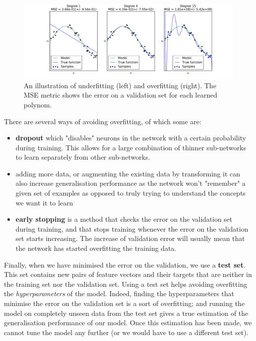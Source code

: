 \begin{figure}
	\centering
	\includegraphics[width=0.8\linewidth]{fig/overfitting.pdf}
	\caption{An illustration of underfitting (left) and overfitting (right).
	The MSE metric shows the error on a validation set for each learned
	polynom.}
	\label{fig:overfitting}
\end{figure}

There are several ways of avoiding overfitting, of which some are:
\begin{itemize}
	\item \textbf{dropout} \cite{dropout} which "disables" neurons in the 
		network with a certain probability during training. This allows
		for a large combination of thinner sub-networks to learn
		separately from other sub-networks.
	\item adding more data, or augmenting the existing data by transforming
		it can also increase generalisation performance as the network
		won't "remember" a given set of examples as opposed to truly
		trying to understand the concepts we want it to learn
	\item \textbf{early stopping} is a method that checks the error
		on the validation set during training, and that stops training
		whenever the error on the validation set starts increasing.
		The increase of validation error will usually mean that the
		network has started overfitting the training data.
\end{itemize}

Finally, when we have minimised the error on the validation, we use 
a \textbf{test set}. This set contains new pairs of feature vectors and their
targets that are neither in the training set nor the validation set. Using
a test set helps avoiding overfitting the \textit{hyperparameters} of the model.
Indeed, finding the hyperparameters that minimise the error on the validation
set is a sort of overfitting; and running the model on completely unseen
data from the test set gives a true estimation of the generalisation performance
of our model. Once this estimation has been made, we cannot tune the model
any further (or we would have to use a different test set).

